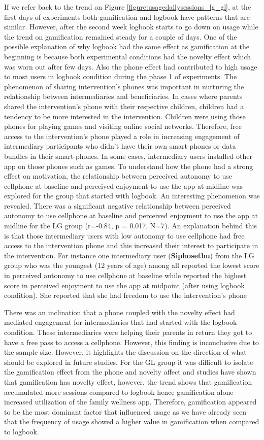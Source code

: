 If we refer back to the trend on Figure \ref{figure:usagedailysessions_lg_gl}, at the first days of experiments both gamification and logbook have patterns that are similar. However, after the second week logbook starts to go down on usage while the trend on gamification remained steady for a couple of days. One of the possible explanation of why logbook had the same effect as gamification at the beginning is because both experimental conditions had the novelty effect which was worn out after few days. Also the phone effect had contributed to high usage to most users in logbook condition during the phase 1 of experiments. The phenomenon of sharing intervention's phones was important in nurturing the relationship between intermediaries and beneficiaries. In cases where parents shared the intervention's phone with their respective children, children had a tendency to be more interested in the intervention. Children were using those phones for playing games and visiting online social networks. Therefore, free access to the intervention's phone played a role in increasing engagement of intermediary participants who didn't have their own smart-phones or data bundles in their smart-phones. In some cases, intermediary users installed other app on those phones such as games. To understand how the phone had a strong effect on motivation, the relationship between perceived autonomy to use cellphone at baseline and perceived enjoyment to use the app at midline was explored for the group that started with logbook. An interesting phenomenon was revealed. There was a significant negative relationship between perceived autonomy to use cellphone at baseline and perceived enjoyment to use the app at midline for the LG group (r=-0.84, p = 0.017, N=7). An explanation behind this is that those intermediary users with low autonomy to use cellphone had free access to the intervention  phone and this increased their interest to participate in the intervention. For instance one intermediary user (\textbf{Siphosethu}) from the LG group who was the youngest (12 years of age) among all reported the lowest score in perceived autonomy to use cellphone at baseline while reported the highest score in  perceived enjoyment to use the app at midpoint (after using logbook condition). She reported that she had freedom to use the intervention's phone

There was an inclination that a phone coupled with the novelty effect had mediated engagement for intermediaries that had started with the logbook condition. These intermediaries were helping their parents in return they got to have a free pass to access a cellphone. However, this finding is inconclusive due to the sample size. However, it highlights the discussion on the direction of what should be explored in future studies. For the GL group it was difficult to isolate the gamification effect from the phone and novelty affect and studies have shown that gamification has novelty effect, however, the trend shows that gamification accumulated more sessions compared to logbook hence gamification alone increased utilization of the family wellness app. Therefore, gamification appeared to be the most dominant factor that influenced usage as we have already seen that the frequency of usage showed a higher value in gamification when compared to logbook.

